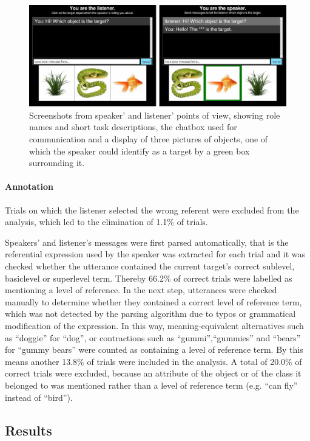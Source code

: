 \documentclass[10pt,letterpaper]{article}
\newcommand{\ndg}[1]{\textcolor{Green}{[ndg: #1]}}
\begin{document}
\begin{figure}[ht!]
\centering
\includegraphics[width=.5\textwidth]{graphs/procedure}
\caption{Screenshots from speaker' and listener' points of view, showing role names and short task descriptions, the chatbox used for communication and a display of three pictures of objects, one of which the speaker could identify as a target by a green box surrounding it.}
\label{fig:procedure}
\end{figure}

\paragraph{\bf Annotation}
Trials on which the listener selected the wrong referent were excluded from the analysis, which led to the elimination of 1.1\% of trials.
 
Speakers' and listener's messages were first parsed automatically, that is the referential expression used by the speaker was extracted for each trial and it was checked whether the utterance contained the current target's correct sublevel, basiclevel or superlevel term. Thereby 66.2\% of correct trials were labelled as mentioning a level of reference. In the next step, utterances were checked manually to determine whether they contained a correct level of reference term, which was not detected by the parsing algorithm due to typos or grammatical modification of the expression. In this way, meaning-equivalent alternatives such as ``doggie'' for ``dog'',  or contractions such as ``gummi'',``gummies'' and ``bears'' for ``gummy bears'' were counted as containing a level of reference term. By this means another 13.8\% of trials were included in the analysis. A total of 20.0\% of correct trials were excluded, because an attribute of the object or of the class it belonged to was mentioned rather than a level of reference term (e.g. ``can fly'' instead of ``bird'').

\subsection{\bf Results}
\end{document}
